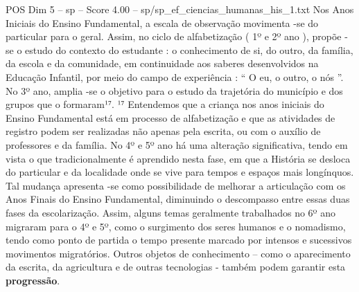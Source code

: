 \begin{textsample}{POS Dim 5 – sp – Score 4.00 – sp/sp\_ef\_ciencias\_humanas\_his\_1.txt}
Nos Anos Iniciais do Ensino Fundamental, a escala de observação movimenta -se do particular para o geral.
Assim, no ciclo de alfabetização ( 1º e 2º ano ), propõe -se o estudo do contexto do estudante : o conhecimento de si, do outro, da família, da escola e da comunidade, em continuidade aos saberes desenvolvidos na Educação Infantil, por meio do campo de experiência : “ O eu, o outro, o nós ”.
No 3º ano, amplia -se o objetivo para o estudo da trajetória do município e dos grupos que o formaram¹⁷. ¹⁷ Entendemos que a criança nos anos iniciais do Ensino Fundamental está em processo de alfabetização e que as atividades de registro podem ser realizadas não apenas pela escrita, ou com o auxílio de professores e da família.
No 4º e 5º ano há uma alteração significativa, tendo em vista o que tradicionalmente é aprendido nesta fase, em que a História se desloca do particular e da localidade onde se vive para tempos e espaços mais longínquos.
Tal mudança apresenta -se como possibilidade de melhorar a articulação com os Anos Finais do Ensino Fundamental, diminuindo o descompasso entre essas duas fases da escolarização.
Assim, alguns temas geralmente trabalhados no 6º ano migraram para o 4º e 5º, como o surgimento dos seres humanos e o nomadismo, tendo como ponto de partida o tempo presente marcado por intensos e sucessivos movimentos migratórios.
Outros objetos de conhecimento – como o aparecimento da escrita, da agricultura e de outras tecnologias - também podem garantir esta \textbf{progressão}.

\end{textsample}
